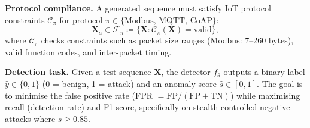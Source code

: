 \textbf{Protocol compliance.}
A generated sequence must satisfy IoT protocol constraints
$\mathcal{C}_\pi$ for protocol $\pi \in \{\text{Modbus, MQTT, CoAP}\}$:
\begin{equation}
  \mathbf{X}_a \in \mathcal{F}_\pi \coloneqq
  \{\mathbf{X} : \mathcal{C}_\pi(\mathbf{X}) = \text{valid}\},
\end{equation}
where $\mathcal{C}_\pi$ checks constraints such as packet size ranges
(Modbus: 7--260 bytes), valid function codes, and inter-packet timing.

\textbf{Detection task.}
Given a test sequence $\mathbf{X}$, the detector $f_\theta$ outputs a
binary label $\hat{y} \in \{0, 1\}$ (0 = benign, 1 = attack) and an
anomaly score $\hat{s} \in [0,1]$.  The goal is to minimise the
false positive rate (FPR $= \text{FP}/(\text{FP}+\text{TN})$) while
maximising recall (detection rate) and F1 score, specifically on
stealth-controlled negative attacks where $s \geq 0.85$.
